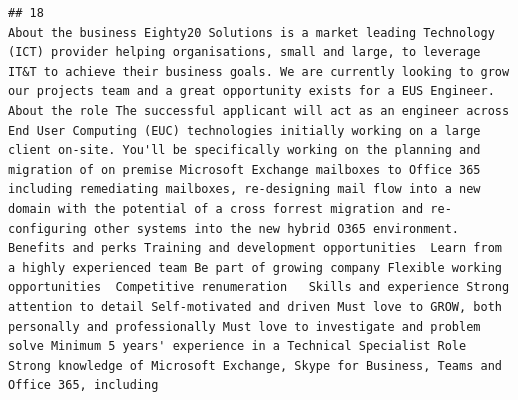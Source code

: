 \documentclass[11pt,a4paper,]{article}
\begin{document}
\begin{verbatim}
## 18                                                                                                                                                                                                                                                                                                                                                                                                                                                                                                                                                                                                                                                                                                                                                                                                                                                                                                                                                                                                                                                                                                                                                                                                                                                                                                                                                                                                                                                                                                                                                                                                                                                                                                                                                                                                                                                                                                                                                                                                                                                                                                                                           About the business Eighty20 Solutions is a market leading Technology (ICT) provider helping organisations, small and large, to leverage IT&T to achieve their business goals. We are currently looking to grow our projects team and a great opportunity exists for a EUS Engineer. About the role The successful applicant will act as an engineer across End User Computing (EUC) technologies initially working on a large client on-site. You'll be specifically working on the planning and migration of on premise Microsoft Exchange mailboxes to Office 365 including remediating mailboxes, re-designing mail flow into a new domain with the potential of a cross forrest migration and re-configuring other systems into the new hybrid O365 environment. Benefits and perks Training and development opportunities  Learn from a highly experienced team Be part of growing company Flexible working opportunities  Competitive renumeration   Skills and experience Strong attention to detail Self-motivated and driven Must love to GROW, both personally and professionally Must love to investigate and problem solve Minimum 5 years' experience in a Technical Specialist Role Strong knowledge of Microsoft Exchange, Skype for Business, Teams and Office 365, including 
\end{verbatim}
\end{document}
